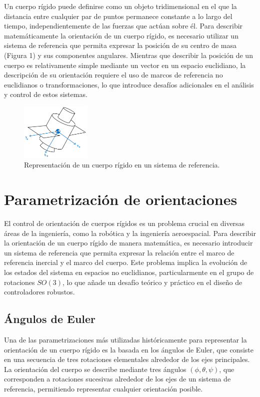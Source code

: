 \documentclass[conference]{IEEEtran}
\begin{document}
Un cuerpo rígido puede definirse como un objeto tridimensional en el que la distancia entre cualquier par de puntos permanece constante a lo largo del tiempo, independientemente de las fuerzas que actúan sobre él. Para describir matemáticamente la orientación de un cuerpo rígido, es necesario utilizar un sistema de referencia que permita expresar la posición de su centro de masa (Figura 1) y sus componentes angulares. Mientras que describir la posición de un cuerpo es relativamente simple mediante un vector en un espacio euclidiano, la descripción de su orientación requiere el uso de marcos de referencia no euclidianos o transformaciones, lo que introduce desafíos adicionales en el análisis y control de estos sistemas.

\begin{figure}[h]
	\centerline{\includegraphics[width=0.3\textwidth]{satelite_cuerpo.jpeg}}
	\caption{Representación de un cuerpo rígido en un sistema de referencia.}
	\label{fig: satelite}
\end{figure}

\section{Parametrización de orientaciones}

El control de orientación de cuerpos rígidos es un problema crucial en diversas áreas de la ingeniería, como la robótica y la ingeniería aeroespacial. Para describir la orientación de un cuerpo rígido de manera matemática, es necesario introducir un sistema de referencia que permita expresar la relación entre el marco de referencia inercial y el marco del cuerpo. Este problema implica la evolución de los estados del sistema en espacios no euclidianos, particularmente en el grupo de rotaciones \( SO(3) \), lo que añade un desafío teórico y práctico en el diseño de controladores robustos.

\subsection{Ángulos de Euler}
Una de las parametrizaciones más utilizadas históricamente para representar la orientación de un cuerpo rígido es la basada en los ángulos de Euler, que consiste en una secuencia de tres rotaciones elementales alrededor de los ejes principales. La orientación del cuerpo se describe mediante tres ángulos \( (\phi, \theta, \psi) \), que corresponden a rotaciones sucesivas alrededor de los ejes de un sistema de referencia, permitiendo representar cualquier orientación posible.
\end{document}
